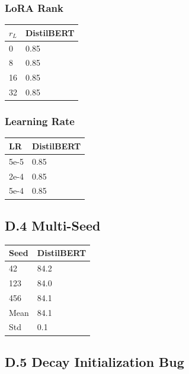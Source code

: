 \subsubsection{LoRA Rank}

\begin{table}[H]
\centering
\small
\begin{tabular}{ll}
\toprule
\textbf{$r_L$} & \textbf{DistilBERT} \\
\midrule
0 & 0.85 \\
8 & 0.85 \\
16 & 0.85 \\
32 & 0.85 \\
\bottomrule
\end{tabular}
\end{table}

\subsubsection{Learning Rate}

\begin{table}[H]
\centering
\small
\begin{tabular}{ll}
\toprule
\textbf{LR} & \textbf{DistilBERT} \\
\midrule
5e-5 & 0.85 \\
2e-4 & 0.85 \\
5e-4 & 0.85 \\
\bottomrule
\end{tabular}
\end{table}

\subsection{D.4 Multi-Seed}

\begin{table}[H]
\centering
\small
\begin{tabular}{ll}
\toprule
\textbf{Seed} & \textbf{DistilBERT} \\
\midrule
42 & 84.2 \\
123 & 84.0 \\
456 & 84.1 \\
Mean & 84.1 \\
Std & 0.1 \\
\bottomrule
\end{tabular}
\end{table}

\subsection{D.5 Decay Initialization Bug}

